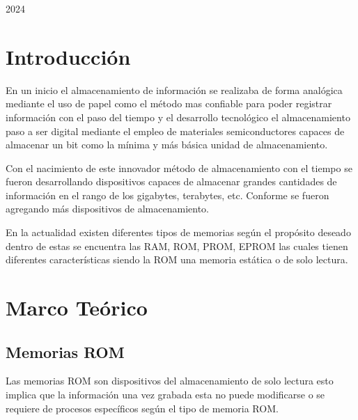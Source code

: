 \documentclass[stu, 10pt, floatsintext]{apa7}
\begin{document}
	
	\vfill %
	
	\begin{center}
		
		2024
	\end{center}
	
	\newpage
	
	
	\setlength{\parindent}{1.27cm}
	
	\renewcommand{\baselinestretch}{2}
	
	\renewcommand{\contentsname}{\large ÍNDICE}

	\section{Introducción}
	En un inicio el almacenamiento de información se realizaba de forma analógica mediante el uso de papel como el método mas confiable para poder registrar información con el paso del tiempo y el desarrollo tecnológico el almacenamiento paso a ser digital mediante el empleo de materiales semiconductores capaces de almacenar un bit como la mínima y más básica unidad de almacenamiento.
	
	Con el nacimiento de este innovador método de almacenamiento con el tiempo se fueron desarrollando dispositivos capaces de almacenar grandes cantidades de información en el rango de los gigabytes, terabytes, etc. Conforme se fueron agregando más dispositivos de almacenamiento.
	
	En la actualidad existen diferentes tipos de memorias según el propósito deseado dentro de estas se encuentra las RAM, ROM, PROM, EPROM las cuales tienen diferentes características siendo la ROM una memoria estática o de solo lectura.
	
	\newpage
	\section{Marco Teórico}
	
	\subsection{Memorias ROM}
	Las memorias ROM son dispositivos del almacenamiento de solo lectura esto implica que la información una vez grabada esta no puede modificarse o se requiere de procesos específicos según el tipo de memoria ROM.
	
\end{document}
